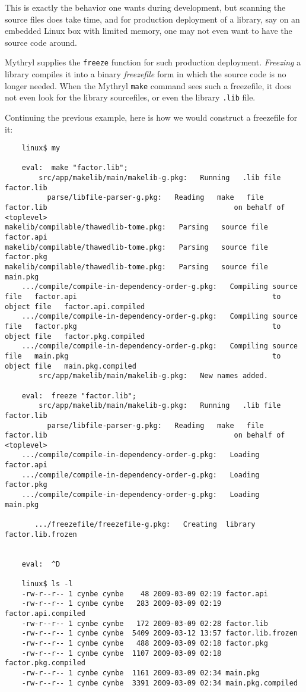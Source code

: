 This is exactly the behavior one wants during development, but scanning the source 
files does take time, and for production deployment of a library, say on an 
embedded Linux box with limited memory, one may not even want to have the source 
code around.

Mythryl supplies the {\tt freeze} function for such production deployment. 
{\it Freezing} a library compiles it into a binary {\it freezefile} form in which the source 
code is no longer needed.  When the Mythryl {\tt make} command sees such a 
freezefile, it does not even look for the library sourcefiles, or even the 
library {\tt .lib} file.

Continuing the previous example, here is how we would construct a freezefile 
for it:

\begin{verbatim}
    linux$ my

    eval:  make "factor.lib";
        src/app/makelib/main/makelib-g.pkg:   Running   .lib file    factor.lib
          parse/libfile-parser-g.pkg:   Reading   make   file   factor.lib                                            on behalf of <toplevel>
makelib/compilable/thawedlib-tome.pkg:   Parsing   source file   factor.api
makelib/compilable/thawedlib-tome.pkg:   Parsing   source file   factor.pkg
makelib/compilable/thawedlib-tome.pkg:   Parsing   source file   main.pkg
    .../compile/compile-in-dependency-order-g.pkg:   Compiling source file   factor.api                                              to object file   factor.api.compiled
    .../compile/compile-in-dependency-order-g.pkg:   Compiling source file   factor.pkg                                              to object file   factor.pkg.compiled
    .../compile/compile-in-dependency-order-g.pkg:   Compiling source file   main.pkg                                                to object file   main.pkg.compiled
        src/app/makelib/main/makelib-g.pkg:   New names added.

    eval:  freeze "factor.lib";
        src/app/makelib/main/makelib-g.pkg:   Running   .lib file    factor.lib
          parse/libfile-parser-g.pkg:   Reading   make   file   factor.lib                                            on behalf of <toplevel>
    .../compile/compile-in-dependency-order-g.pkg:   Loading                 factor.api
    .../compile/compile-in-dependency-order-g.pkg:   Loading                 factor.pkg
    .../compile/compile-in-dependency-order-g.pkg:   Loading                 main.pkg

       .../freezefile/freezefile-g.pkg:   Creating  library       factor.lib.frozen


    eval:  ^D

    linux$ ls -l
    -rw-r--r-- 1 cynbe cynbe    48 2009-03-09 02:19 factor.api
    -rw-r--r-- 1 cynbe cynbe   283 2009-03-09 02:19 factor.api.compiled
    -rw-r--r-- 1 cynbe cynbe   172 2009-03-09 02:28 factor.lib
    -rw-r--r-- 1 cynbe cynbe  5409 2009-03-12 13:57 factor.lib.frozen
    -rw-r--r-- 1 cynbe cynbe   488 2009-03-09 02:18 factor.pkg
    -rw-r--r-- 1 cynbe cynbe  1107 2009-03-09 02:18 factor.pkg.compiled
    -rw-r--r-- 1 cynbe cynbe  1161 2009-03-09 02:34 main.pkg
    -rw-r--r-- 1 cynbe cynbe  3391 2009-03-09 02:34 main.pkg.compiled
\end{verbatim}

